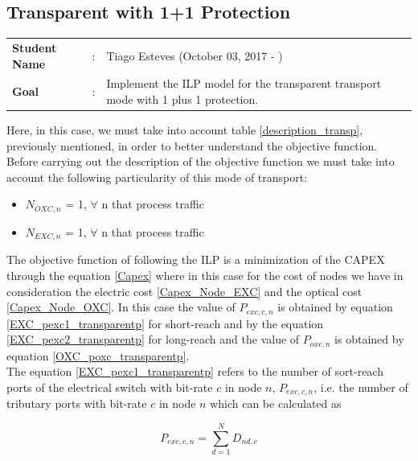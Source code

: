 \clearpage

\subsection{Transparent with 1+1 Protection}\label{ILP_Transp_Protection}
\begin{tcolorbox}	
\begin{tabular}{p{2.75cm} p{0.2cm} p{10.5cm}} 	
\textbf{Student Name}  &:& Tiago Esteves    (October 03, 2017 - )\\
\textbf{Goal}          &:& Implement the ILP model for the transparent transport mode with 1 plus 1 protection.
\end{tabular}
\end{tcolorbox}
\vspace{11pt}

Here, in this case, we must take into account table \ref{description_transp}, previously mentioned, in order to better understand the objective function.\\

Before carrying out the description of the objective function we must take into account the following particularity of this mode of transport:
\begin{itemize}
  \item $N_{OXC,n}$ = 1, \quad $\forall$ n that process traffic
  \item $N_{EXC,n}$ = 1, \quad $\forall$ n that process traffic
\end{itemize}

\vspace{11pt}
The objective function of following the ILP is a minimization of the CAPEX through the equation \ref{Capex} where in this case for the cost of nodes we have in consideration the electric cost \ref{Capex_Node_EXC} and the optical cost \ref{Capex_Node_OXC}.
In this case the value of $P_{exc,c,n}$ is obtained by equation \ref{EXC_pexc1_transparentp} for short-reach and by the equation \ref{EXC_pexc2_transparentp} for long-reach and the value of $P_{oxc,n}$ is obtained by equation \ref{OXC_poxc_transparentp}.\\

The equation \ref{EXC_pexc1_transparentp} refers to the number of sort-reach ports of the electrical switch with bit-rate $c$ in node $n$, $P_{exc,c,n}$, i.e. the number of tributary ports with bit-rate $c$ in node $n$ which can be calculated as

\begin{equation}
P_{exc,c,n} = \sum_{d=1}^{N} D_{nd,c}
\label{EXC_pexc1_transparentp}
\end{equation}

